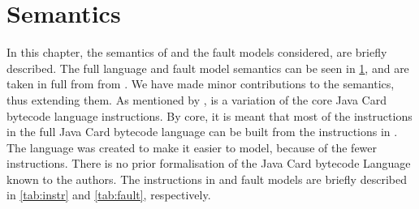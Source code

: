 \section{Semantics}\label{chap:semantics}
%
%
%
In this chapter, the semantics of \jcl and the fault models considered, are briefly described. The full language and fault model semantics can be seen in \cref{chap:semantics}, and are taken in full from from \cite{javasec}. We have made minor contributions to the semantics, thus extending them. As mentioned by \cite{javasec}, \jcl is a variation of the core Java Card bytecode language instructions. By core, it is meant that most of the instructions in the full  Java Card bytecode language can be built from the instructions in \jcl. The language was created to make it easier to model, because of the fewer instructions. There is no prior formalisation of the Java Card bytecode Language known to the authors. The instructions in \jcl and fault models are briefly described in \cref{tab:instr} and \cref{tab:fault}, respectively. 


%

